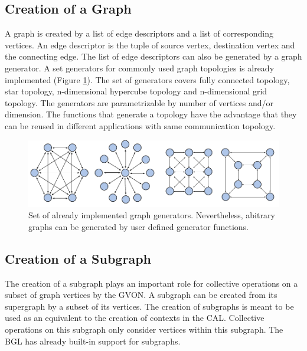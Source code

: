 \subsection{Creation of a Graph}
A graph is created by a list of edge descriptors and a list of
corresponding vertices. An edge descriptor is the tuple of source
vertex, destination vertex and the connecting edge. The list of edge
descriptors can also be generated by a graph generator. A set
generators for commonly used graph topologies is already implemented
(Figure \ref{fig:topologies}).  The set of generators covers fully
connected topology, star topology, n-dimensional hypercube topology
and n-dimensional grid topology.  The generators are  parametrizable  by
number of vertices and/or dimension.  The functions that generate a
topology have the advantage that they can be reused in different
applications with same communication topology.

\begin{figure}[H]
  \centering
  \includegraphics[width=\textwidth]{graphics/40_topologies}
  \caption{Set of already implemented graph generators. Nevertheless,
  abitrary graphs can be generated by user defined generator functions.}
  \label{fig:topologies}
\end{figure}

\subsection{Creation of a Subgraph}
The creation of a subgraph plays an important role for collective
operations on a subset of graph vertices by the GVON. A subgraph can be created
from its supergraph by a subset of its vertices.  The creation of
subgraphs is meant to be used as an equivalent to the creation of
contexts in the CAL. Collective operations on this subgraph only
consider vertices within this subgraph. The BGL has already built-in
support for subgraphs.

